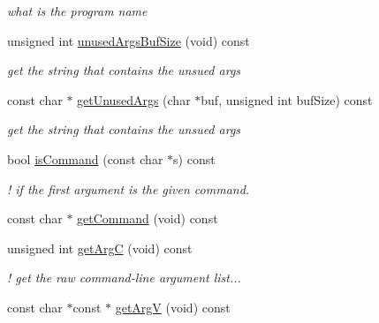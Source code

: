 \begin{DoxyCompactItemize}
\begin{DoxyCompactList}\small\item\em what is the program name \item\end{DoxyCompactList}\item 
\hypertarget{classFramework_1_1CommandLine_a0f1568c1504f064d6a5748782e7e8b43}{
unsigned int \hyperlink{classFramework_1_1CommandLine_a0f1568c1504f064d6a5748782e7e8b43}{unusedArgsBufSize} (void) const }
\label{classFramework_1_1CommandLine_a0f1568c1504f064d6a5748782e7e8b43}

\begin{DoxyCompactList}\small\item\em get the string that contains the unsued args \item\end{DoxyCompactList}\item 
\hypertarget{classFramework_1_1CommandLine_ab7124a5702ae54c93d4c9d8db5293311}{
const char $\ast$ \hyperlink{classFramework_1_1CommandLine_ab7124a5702ae54c93d4c9d8db5293311}{getUnusedArgs} (char $\ast$buf, unsigned int bufSize) const }
\label{classFramework_1_1CommandLine_ab7124a5702ae54c93d4c9d8db5293311}

\begin{DoxyCompactList}\small\item\em get the string that contains the unsued args \item\end{DoxyCompactList}\item 
bool \hyperlink{classFramework_1_1CommandLine_a75af5f62d04b30d2c7fbae3af303b5cc}{isCommand} (const char $\ast$s) const 
\begin{DoxyCompactList}\small\item\em ! if the first argument is the given command. \item\end{DoxyCompactList}\item 
const char $\ast$ \hyperlink{classFramework_1_1CommandLine_aeed4f667a73000dcbe25506af165f3bd}{getCommand} (void) const 
\item 
\hypertarget{classFramework_1_1CommandLine_aaefe029993e878b1431396b482e9aa19}{
unsigned int \hyperlink{classFramework_1_1CommandLine_aaefe029993e878b1431396b482e9aa19}{getArgC} (void) const }
\label{classFramework_1_1CommandLine_aaefe029993e878b1431396b482e9aa19}

\begin{DoxyCompactList}\small\item\em ! get the raw command-\/line argument list... \item\end{DoxyCompactList}\item 
\hypertarget{classFramework_1_1CommandLine_ade6c77a6c2ea99d170a5189ede746d4f}{
const char $\ast$const $\ast$ \hyperlink{classFramework_1_1CommandLine_ade6c77a6c2ea99d170a5189ede746d4f}{getArgV} (void) const }
\label{classFramework_1_1CommandLine_ade6c77a6c2ea99d170a5189ede746d4f}


\end{DoxyCompactItemize}
